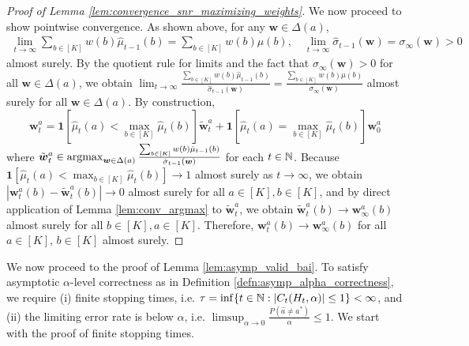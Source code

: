 \documentclass{article}
\begin{document}
\begin{appendices}
\begin{proof}[Proof of Lemma \ref{lem:convergence_snr_maximizing_weights}]
We now proceed to show pointwise convergence. As shown above, for any $\bm{w} \in \Delta(a)$, 
\begin{align}
    \lim_{t \rightarrow \infty} \sum_{b \in [K]} w(b)\hat\mu_{t-1}(b) = \sum_{b \in [K]} w(b) \mu(b), \quad \lim_{t \rightarrow \infty}\hat\sigma_{t-1}(\bm{w}) = \sigma_\infty(\bm{w}) > 0
\end{align}
almost surely. By the quotient rule for limits and the fact that $\sigma_\infty(\bm{w}) > 0$ for all $\bm{w} \in \Delta(a)$, we obtain $\lim_{t \rightarrow \infty}\frac{\sum_{b \in [K]} w(b)\hat\mu_{t-1}(b)}{\hat\sigma_{t-1}(\bm{w})} = \frac{\sum_{b \in [K]} w(b) \mu(b)}{\sigma_\infty(\bm{w})}$ almost surely for all $\bm{w} \in \Delta(a)$. By construction,
\begin{equation}
    \bm{w}_t^a = \mathbf{1}\left[\hat{\mu}_t(a) < \max_{b \in [K]}\hat\mu_t(b)\right] \tilde{\bm{w}}_t^a + \mathbf{1}\left[\hat{\mu}_t(a) = \max_{b \in [K]}\hat\mu_t(b)\right] {\bm{w}}_0^a 
\end{equation}
where $\tilde{\bm{w}}_t^a \in \argmax_{\bm{w} \in \Delta(a)} \frac{\sum_{b \in [K]} w(b)\hat\mu_{t-1}(b)}{\hat\sigma_{t-1}(\bm{w})}$ for each $t \in \mathbb{N}$. Because $\mathbf{1}\left[\hat{\mu}_t(a) < \max_{b \in [K]}\hat\mu_t(b)\right] \rightarrow 1$ almost surely as $t \rightarrow \infty$, we obtain $|\bm{w}_t^a(b) - \tilde{\bm{w}}_t^a(b)| \rightarrow 0$ almost surely for all $a\in[K], b\in [K]$, and by direct application of Lemma \ref{lem:conv_argmax} to $\tilde{\bm{w}}_t^a$, we obtain $\tilde{\bm{w}}_t^a(b) \rightarrow \bm{w}_\infty^a(b)$ almost surely for all $b \in [K], a\in [K]$. Therefore, $\bm{w}_t^a(b) \rightarrow \bm{w}_\infty^a(b)$ for all $a \in [K]$, $b\in [K]$ almost surely.
\end{proof}

We now proceed to the proof of Lemma \ref{lem:asymp_valid_bai}. To satisfy asymptotic $\alpha$-level correctness as in Definition \ref{defn:asymp_alpha_correctness}, we require (i) finite stopping times, i.e. $\tau = \inf\{t \in \mathbb{N}: |C_t(H_t, \alpha)| \leq 1 \} < \infty$, and (ii) the limiting error rate is below $\alpha$, i.e. $\limsup_{\alpha \rightarrow 0}\frac{P( \hat{a} \neq a^*)}{\alpha} \leq 1$. We start with the proof of finite stopping times. 


\end{appendices}
\end{document}
